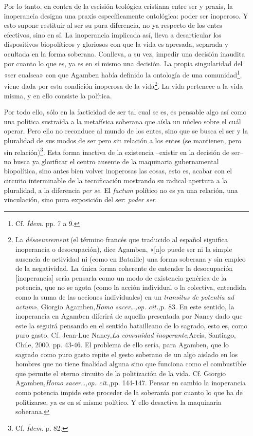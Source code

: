 Por lo tanto, en contra de la escisión teológica cristiana entre ser y praxis, la inoperancia designa una praxis específicamente ontológica: poder ser inoperoso. Y esto supone restituir al ser su pura diferencia, no ya respecto de los entes efectivos, sino en sí. La inoperancia implicada así, lleva a desarticular los dispositivos biopolíticos y gloriosos con que la vida es apresada, separada y ocultada en la forma soberana. Conlleva, a su vez, impedir una decisión inaudita por cuanto lo que es, ya es en sí mismo una decisión. La propia singularidad del «ser cualsea» con que Agamben había definido la ontología de una comunidad\footnote{Cf. \emph{Ídem}. pp. 7 a 9.}, viene dada por esta condición inoperosa de la vida\footnote{La \emph{désoeuvrement} (el término francés que traducido al español significa inoperancia o desocupación), dice Agamben, «{[}n{]}o puede ser ni la simple ausencia de actividad ni (como en Bataille) una forma soberana y sin empleo de la negatividad. La única forma coherente de entender la desocupación {[}inoperancia{]} sería pensarla como un modo de existencia genérica de la potencia, que no se agota (como la acción individual o la colectiva, entendida como la suma de las acciones individuales) en un \emph{transitus de potentia ad actum}». Giorgio Agamben,\emph{Homo sacer\ldots,op. cit.,}p. 83. En este sentido, la inoperancia en Agamben diferirá de aquella presentada por Nancy dado que este la seguirá pensando en el sentido batailleano de lo sagrado, esto es, como puro gasto. Cf. Jean-Luc Nancy,\emph{La comunidad inoperante},Arcis, Santiago, Chile, 2000. pp. 43-46. El problema de ello sería, para Agamben, que lo sagrado como puro gasto repite el gesto soberano de un algo aislado en los hombres que no tiene finalidad alguna sino que funciona como el combustible que permite el eterno circuito de la politización de la vida. Cf. Giorgio Agamben,\emph{Homo sacer\ldots,op. cit.,}pp. 144-147. Pensar en cambio la inoperancia como potencia impide este proceder de la soberanía por cuanto lo que ha de politizarse, ya es en sí mismo político. Y ello desactiva la maquinaria soberana.}. La vida pertenece a la vida misma, y en ello consiste la política.

Por todo ello, sólo en la facticidad de ser tal cual se es, es pensable algo así como una política sustraída a la metafísica soberana que aísla un núcleo sobre el cuál operar. Pero ello no reconduce al mundo de los entes, sino que se busca el ser y la pluralidad de sus modos de ser pero sin relación a los entes (se mantienen, pero sin relación)\footnote{Cf. \emph{Ídem}. p. 82.}. Esta forma inactiva de la existencia --existir en la decisión de ser-- no busca ya glorificar el centro ausente de la maquinaria gubernamental biopolítica, sino antes bien volver inoperosas las cosas, esto es, acabar con el circuito interminable de la tecnificación mostrando su radical apertura a la pluralidad, a la diferencia \emph{per se}. El \emph{factum} político no es ya una relación, una vinculación, sino pura exposición del ser: \emph{poder ser}.

